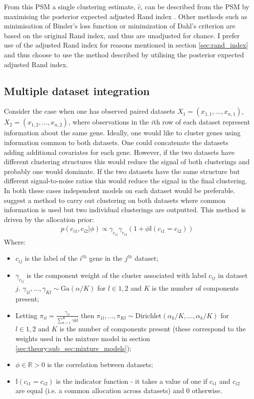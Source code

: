 \documentclass[12pt]{article} %
\begin{document}
	From this PSM a single clustering estimate, $\hat{c}$, can be described from the PSM by maximising the posterior expected adjusted Rand index \cite{FritschImprovedcriteriaclustering2009}. Other methods such as minimisation of Binder's loss function or  minimization of Dahl's criterion are based on the original Rand index, and thus are unadjusted for chance. I prefer use of the adjusted Rand index for reasons mentioned in section \ref{sec:rand_index} and thus choose to use the method described by \citet{FritschImprovedcriteriaclustering2009} utilising the  posterior expected adjusted Rand index.
	
	\subsection{Multiple dataset integration}
	Consider the case when one has observed paired datasets $X_1 = (x_{1,1},\ldots,x_{n,1})$, $X_2 = (x_{1,2},\ldots,x_{n,2})$, where observations in the $i$th row of each dataset represent information about the same gene. Ideally, one would like to cluster genes using information common to both datasets. One could concatenate the datasets adding additional covariates for each gene. However, if the two datasets have different clustering structures this would reduce the signal of both clusterings and probably one would dominate. If the two datasets have the same structure but different signal-to-noise ratios this would reduce the signal in the final clustering. In both these cases independent models on each dataset would be preferable. \citet{KirkBayesiancorrelatedclustering2012} suggest a method to carry out clustering on both datasets where common information is used but two individual clusterings are outputted. This method is driven by the allocation prior:
	\begin{align} \label{allocation_prior_l_2}
	p(c_{i1}, c_{i2} | \phi ) \propto \gamma_{c_{i1}} \gamma_{c_{i2}} (1 + \phi \mathbb{I}(c_{i1} = c_{i2}))
	\end{align}
	Where:
	\begin{itemize}
		\item $c_{ij}$ is the label of the $i^{th}$ gene in the $j^{th}$ dataset;
		\item $\gamma_{c_{ij}}$ is the component weight of the cluster associated with label $c_{ij}$ in dataset $j$. $\gamma_{1l},\ldots,\gamma_{Kl} \sim \text{Ga}(\alpha / K)$ for $l \in {1,2}$ and $K$ is the number of components present;
		\item Letting $\pi_{il} = \frac{\gamma_{il}}{\sum_{k=1}^K \gamma{kl}}$ then $\pi_{1l},\ldots,\pi_{Kl} \sim \text{Dirichlet}(\alpha_k / K, \ldots, \alpha_k / K)$ for $l \in {1,2}$ and $K$ is the number of components present (these correspond to the weights used in the mixture model in section \ref{sec:theory:sub_sec:mixture_models});
		\item $\phi \in \mathbb{R} > 0$ is the correlation between datasets;
		\item $\mathbb{I}(c_{i1} = c_{i2})$ is the indicator function - it takes a value of one if $c_{i1}$ and $c_{i2}$ are equal (i.e. a common allocation across datasets) and 0 otherwise.
	\end{itemize}
\end{document}
